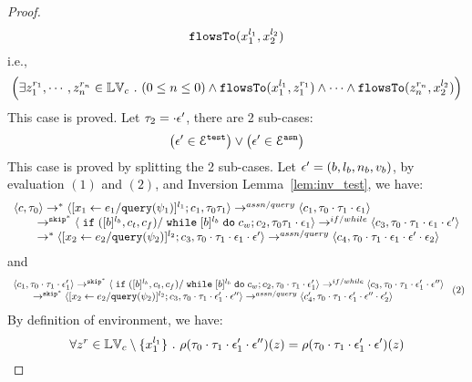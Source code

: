 \begin{proof}
%
\[
\mathtt{flowsTo}(x_1^{l_1}, {x}_2^{l_2})
\]
i.e.,
%
\[
\Big(\exists z_1^{r_1}, \cdots, z_n^{r_n} \in \mathbb{LV}_{{c}} ~.~ (0 \leq n \leq 0 )
 \land \mathtt{flowsTo}(x_1^{l_1}, z_1^{r_1}) \land \cdots \land \mathtt{flowsTo}(z_n^{r_n}, {x}_2^{l_2}) \Big)
 \]
%
This case is proved.
%
%
Let $\mathtt{\tau}_2 = \cdot \mathtt{\epsilon}'$, there are 2 sub-cases: 
%
 \[
 \big(\mathtt{\epsilon}' \in \mathcal{E}^{\mathtt{{test}}}\big) \lor \big(\mathtt{\epsilon}' \in \mathcal{E}^{\mathtt{{asn}}}\big)
 \]
%
This case is proved by splitting the 2 sub-cases.
%
Let $\mathtt{\epsilon}' = (b, l_b, n_b, v_b)$, by evaluation $(1)$ and $(2)$, and {Inversion Lemma~\ref{lem:inv_test}}, we have:
\[
  \begin{array}{l}   
\langle {c}, \mathtt{\tau}_0 \rangle \rightarrow^{*} 
\langle [\mathrel{ {x}_1 \leftarrow e_1 / {\tt query}(\psi_1) }]^{l_1} ; {c}_1, \mathtt{\tau}_0 \mathtt{\tau}_1 \rangle  
\rightarrow^{assn/query}
 \langle c_1, \mathtt{\tau}_0 \cdot \mathtt{\tau}_1 \cdot \mathtt{\epsilon}_1 \rangle 
 \\
  \qquad \rightarrow^{\mathtt{skip}^*} 
  \langle \;\mathtt{if}\; ([b]^{l_b}, c_t, c_f) / \;\mathtt{while}\; [b]^{l_b} \;\mathtt{do}\; c_w;{c}_2, 
  \mathtt{\tau}_0 \mathtt{\tau}_1 \cdot \mathtt{\epsilon}_1 \rangle 
 \rightarrow^{if / while} 
  \langle c_3, 
  \mathtt{\tau}_0 \cdot \mathtt{\tau}_1 \cdot \mathtt{\epsilon}_1 \cdot \mathtt{\epsilon}' \rangle 
  \\
  \qquad   \rightarrow^{*} 
  \langle [\mathrel{ {x}_2 \leftarrow e_2 / {\tt query}(\psi_2) }]^{l_2};{c}_3, 
  \mathtt{\tau}_0 \cdot \mathtt{\tau}_1 \cdot \mathtt{\epsilon}_1 \cdot \mathtt{\epsilon}' \rangle 
  \rightarrow^{assn/query} 
  \langle {c}_4,  \mathtt{\tau}_0 \cdot \mathtt{\tau}_1 \cdot \mathtt{\epsilon}_1 \cdot \mathtt{\epsilon}' \cdot \mathtt{\epsilon}_2 \rangle 
\end{array}
 \]
 and 
  \[
  \begin{array}{l}   
  \langle c_1, \mathtt{\tau}_0 \cdot \mathtt{\tau}_1 \cdot \mathtt{\epsilon}_1' \rangle 
  \rightarrow^{\mathtt{skip}^*} 
  \langle \;\mathtt{if}\; ([b]^{l_b}, c_t, c_f) / \;\mathtt{while}\; [b]^{l_b} \;\mathtt{do}\; c_w;{c}_2, 
  \mathtt{\tau}_0 \cdot \mathtt{\tau}_1 \cdot \mathtt{\epsilon}_1' \rangle 
  \rightarrow^{if / while} 
  \langle c_3, 
  \mathtt{\tau}_0 \cdot \mathtt{\tau}_1 \cdot \mathtt{\epsilon}_1' \cdot \mathtt{\epsilon}'' \rangle 
  \\
  \qquad \rightarrow^{\mathtt{skip}^*} 
  \langle [\mathrel{ {x}_2 \leftarrow e_2 / {\tt query}(\psi_2) }]^{l_2};{c}_3, 
  \mathtt{\tau}_0 \cdot \mathtt{\tau}_1 \cdot \mathtt{\epsilon}_1' \cdot \mathtt{\epsilon}'' \rangle 
  \rightarrow^{assn/query} 
  \langle {c}_4',  \mathtt{\tau}_0 \cdot \mathtt{\tau}_1 \cdot \mathtt{\epsilon}_1' \cdot \mathtt{\epsilon}'' \cdot \mathtt{\epsilon}_2' \rangle 
\end{array} ~(2)
 \]
%
By definition of environment, we have:
\[
  \forall z^r \in \mathbb{LV}_c \setminus \{x_1^{l_1}\} ~.~
  \rho(\mathtt{\tau}_0 \cdot \mathtt{\tau}_1 \cdot \mathtt{\epsilon}_1' \cdot \mathtt{\epsilon}'') (z) =  
  \rho(\mathtt{\tau}_0 \cdot \mathtt{\tau}_1 \cdot \mathtt{\epsilon}_1' \cdot \mathtt{\epsilon}') (z)
\]
\end{proof}
